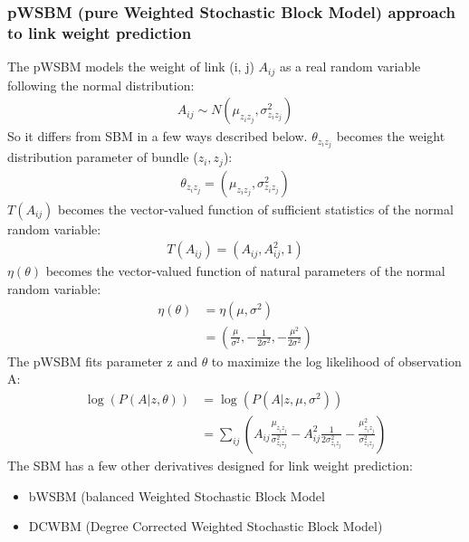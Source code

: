 \documentclass{article}
\begin{document}
\subsubsection{pWSBM (pure Weighted Stochastic Block Model) approach to link weight prediction}
The pWSBM models the weight of link (i, j) $ A_{ij} $ as a real random variable following the normal distribution:
\begin{align*}
A_{ij} \sim N(\mu_{z_i z_j}, \sigma_{z_i z_j}^2)
\end{align*}
So it differs from SBM in a few ways described below.
$ \theta_{z_i z_j} $ becomes the weight distribution parameter of bundle ($z_i, z_j$):
\begin{align*}
\theta_{z_i z_j} = (\mu_{z_i z_j}, \sigma_{z_i z_j}^2)
\end{align*}
$ T(A_{ij}) $ becomes the vector-valued function of sufficient statistics of the normal random variable:
\begin{align*}
T(A_{ij}) = (A_{ij}, A_{ij}^2, 1)
\end{align*}
$ \eta(\theta) $ becomes the vector-valued function of natural parameters of the normal random variable:
\begin{align*}
\eta(\theta)
&= \eta(\mu, \sigma^2)\\
&= (\frac{\mu}{\sigma^2}, -\frac{1}{2\sigma^2}, -\frac{\mu^2}{2\sigma^2})
\end{align*}
The pWSBM fits parameter z and $ \theta $
to maximize the log likelihood of observation A:
\begin{align*}
\log(P(A|z, \theta))
&= \log(P(A|z, \mu, \sigma^2))\\
&= \sum_{ij} (
A_{ij} \frac{\mu_{z_i z_j}}{\sigma_{z_i z_j}^2}
- A_{ij}^2 \frac{1}{2\sigma_{z_i z_j}^2}
- \frac{\mu_{z_i z_j}^2}{\sigma_{z_i z_j}^2}
)
\end{align*}
The SBM has a few other derivatives designed for link weight prediction:
\begin{itemize}
	\item bWSBM (balanced Weighted Stochastic Block Model
	\item DCWBM (Degree Corrected Weighted Stochastic Block Model)
\end{itemize}
\end{document}
